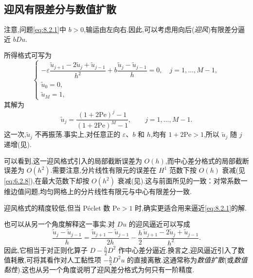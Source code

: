\subsection{迎风有限差分与数值扩散}\label{sec:8.2.2}

注意,问题\eqref{eq:8.2.1}中 \(b>0\),输运由左向右.因此,可以考虑用向后(\emph{迎风})有限差分逼近 \(bDu\).

所得格式可写为
\begin{equation}\label{eq:8.2.10}
  \begin{cases}
    -\varepsilon\dfrac{\widetilde u_{j+1}-2\widetilde u_j+\widetilde u_{j-1}}{h^2}
       +b\dfrac{\widetilde u_j-\widetilde u_{j-1}}h=0,\quad j=1,\ldots,M-1,\\[6pt]
    \widetilde u_0=0,\\
    \widetilde u_M=1,
  \end{cases}
\end{equation}
其解为
\begin{equation}\label{eq:8.2.11}
  \widetilde u_j=\frac{(1+2\mathrm{Pe})^j-1}{(1+2\mathrm{Pe})^M-1},
    \qquad j=1,\ldots,M-1.
\end{equation}
这一次,\(\widetilde u_j\) 不再振荡.事实上,对任意正的 \(\varepsilon\)、\(b\) 和 \(h\),均有 \(1+2\mathrm{Pe}>1\),所以 \(\widetilde u_j\) 随 \(j\) 递增(见).

可以看到,这一迎风格式引入的局部截断误差为 \(O(h)\),而中心差分格式的局部截断误差为 \(O(h^2)\).需要注意,分片线性有限元的误差在 \(H^1\) 范数下按 \(O(h)\) 衰减(见\eqref{eq:6.2.8}),在最大范数下却按 \(O(h^2)\) 衰减(见).这与前面所见的一致：对常系数一维边值问题,均匀网格上的分片线性有限元与中心有限差分一致.

迎风格式的精度较低,但当 Péclet 数 \(\mathrm{Pe}>1\) 时,确实更适合用来逼近\eqref{eq:8.2.1}的解.

也可以从另一个角度解释这一事实.对 \(Du\) 的迎风逼近可以写成
\[
  \frac{\widetilde u_j-\widetilde u_{j-1}}h
   =\frac{\widetilde u_{j+1}-\widetilde u_{j-1}}{2h}
    -\frac h2\frac{\widetilde u_{j+1}-2\widetilde u_j+\widetilde u_{j-1}}{h^2}.
\]
因此,它相当于对正则化算子 \(D-\tfrac h2D^2\) 作中心差分逼近.换言之,迎风逼近引入了数值耗散,可将其看作对人工黏性项 \(-\tfrac h2D^2u\) 的直接离散.这通常称为\emph{数值扩散}(或\emph{数值黏性}).这也从另一个角度说明了迎风差分格式为何只有一阶精度.

